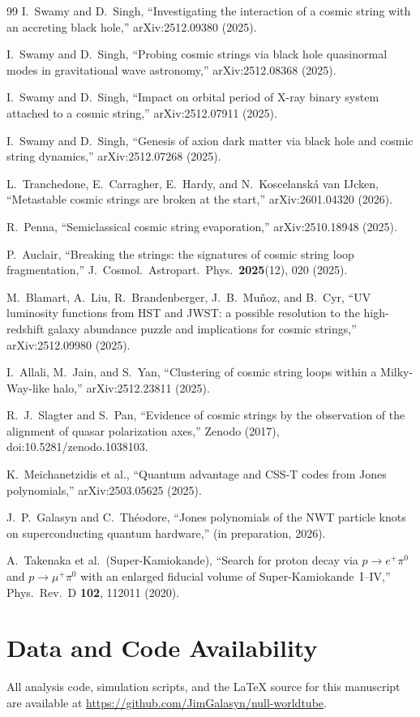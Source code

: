 \documentclass[11pt]{article}
\begin{document}
\begin{thebibliography}{99}
 I.~Swamy and D.~Singh, ``Investigating the interaction of a cosmic string with an accreting black hole,'' arXiv:2512.09380 (2025).

 I.~Swamy and D.~Singh, ``Probing cosmic strings via black hole quasinormal modes in gravitational wave astronomy,'' arXiv:2512.08368 (2025).

 I.~Swamy and D.~Singh, ``Impact on orbital period of X-ray binary system attached to a cosmic string,'' arXiv:2512.07911 (2025).

 I.~Swamy and D.~Singh, ``Genesis of axion dark matter via black hole and cosmic string dynamics,'' arXiv:2512.07268 (2025).

 L.~Tranchedone, E.~Carragher, E.~Hardy, and N.~Koscelansk\'a van IJcken, ``Metastable cosmic strings are broken at the start,'' arXiv:2601.04320 (2026).

 R.~Penna, ``Semiclassical cosmic string evaporation,'' arXiv:2510.18948 (2025).

 P.~Auclair, ``Breaking the strings: the signatures of cosmic string loop fragmentation,'' J.\ Cosmol.\ Astropart.\ Phys.\ \textbf{2025}(12), 020 (2025).

 M.~Blamart, A.~Liu, R.~Brandenberger, J.~B.~Mu\~noz, and B.~Cyr, ``UV luminosity functions from HST and JWST: a possible resolution to the high-redshift galaxy abundance puzzle and implications for cosmic strings,'' arXiv:2512.09980 (2025).

 I.~Allali, M.~Jain, and S.~Yan, ``Clustering of cosmic string loops within a Milky-Way-like halo,'' arXiv:2512.23811 (2025).

 R.~J.~Slagter and S.~Pan, ``Evidence of cosmic strings by the observation of the alignment of quasar polarization axes,'' Zenodo (2017), doi:10.5281/zenodo.1038103.

 K.~Meichanetzidis et al., ``Quantum advantage and CSS-T codes from Jones polynomials,'' arXiv:2503.05625 (2025).

 J.~P.~Galasyn and C.~Th\'eodore, ``Jones polynomials of the NWT particle knots on superconducting quantum hardware,'' (in preparation, 2026).

 A.~Takenaka et al.\ (Super-Kamiokande), ``Search for proton decay via $p \to e^+\pi^0$ and $p \to \mu^+\pi^0$ with an enlarged fiducial volume of Super-Kamiokande~I--IV,'' Phys.\ Rev.\ D \textbf{102}, 112011 (2020).

\end{thebibliography}

\section*{Data and Code Availability}

All analysis code, simulation scripts, and the LaTeX source for this manuscript are available at \url{https://github.com/JimGalasyn/null-worldtube}.
\end{document}
